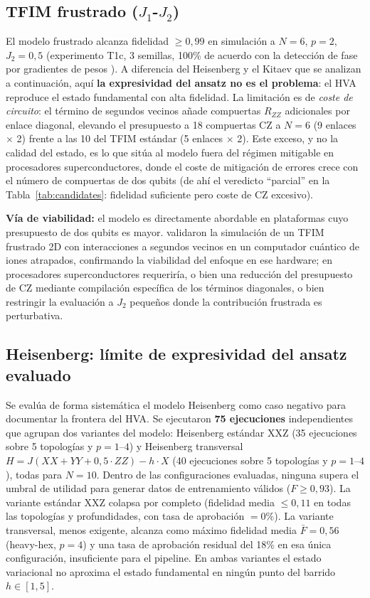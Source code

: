 \documentclass[11pt,a4paper,spanish]{book}
\begin{document}
\subsection{TFIM frustrado ($J_1$-$J_2$)}

El modelo frustrado alcanza fidelidad $\geq 0,99$ en simulación a $N = 6$, $p = 2$, $J_2 = 0,5$ (experimento T1c, 3 semillas, 100\% de acuerdo con la detección de fase por gradientes de pesos \citep{hernandes2025}). A diferencia del Heisenberg y el Kitaev que se analizan a continuación, aquí \textbf{la expresividad del ansatz no es el problema}: el HVA reproduce el estado fundamental con alta fidelidad. La limitación es de \emph{coste de circuito}: el término de segundos vecinos añade compuertas $R_{ZZ}$ adicionales por enlace diagonal, elevando el presupuesto a 18 compuertas CZ a $N = 6$ (9 enlaces $\times$ 2) frente a las 10 del TFIM estándar (5 enlaces $\times$ 2). Este exceso, y no la calidad del estado, es lo que sitúa al modelo fuera del régimen mitigable en procesadores superconductores, donde el coste de mitigación de errores crece con el número de compuertas de dos qubits \citep{tsubouchi2023} (de ahí el veredicto ``parcial'' en la Tabla~\ref{tab:candidates}: fidelidad suficiente pero coste de CZ excesivo).

\textbf{Vía de viabilidad:} el modelo es directamente abordable en plataformas cuyo presupuesto de dos qubits es mayor. \citet{teoh2025} validaron la simulación de un TFIM frustrado 2D con interacciones a segundos vecinos en un computador cuántico de iones atrapados, confirmando la viabilidad del enfoque en ese hardware; en procesadores superconductores requeriría, o bien una reducción del presupuesto de CZ mediante compilación específica de los términos diagonales, o bien restringir la evaluación a $J_2$ pequeños donde la contribución frustrada es perturbativa.

\subsection{Heisenberg: límite de expresividad del ansatz evaluado}

Se evalúa de forma sistemática el modelo Heisenberg como caso negativo para documentar la frontera del HVA. Se ejecutaron \textbf{75 ejecuciones} independientes que agrupan dos variantes del modelo: Heisenberg estándar XXZ (35 ejecuciones sobre 5 topologías y $p = 1$--$4$) y Heisenberg transversal $H = J(XX + YY + 0,5 \cdot ZZ) - h \cdot X$ (40 ejecuciones sobre 5 topologías y $p = 1$--$4$), todas para $N = 10$. Dentro de las configuraciones evaluadas, ninguna supera el umbral de utilidad para generar datos de entrenamiento válidos ($F \geq 0,93$). La variante estándar XXZ colapsa por completo (fidelidad media $\leq 0,11$ en todas las topologías y profundidades, con tasa de aprobación $= 0\%$). La variante transversal, menos exigente, alcanza como máximo fidelidad media $\bar{F} = 0,56$ (heavy-hex, $p = 4$) y una tasa de aprobación residual del 18\% en esa única configuración, insuficiente para el pipeline. En ambas variantes el estado variacional no aproxima el estado fundamental en ningún punto del barrido $h \in [1, 5]$.
\end{document}
